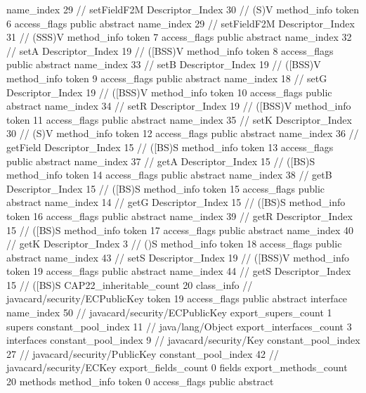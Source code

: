 {{{{{					name_index	29		// setFieldF2M
					Descriptor_Index	30		// (S)V
				}
				method_info {
					token	6
					access_flags	public abstract
					name_index	29		// setFieldF2M
					Descriptor_Index	31		// (SSS)V
				}
				method_info {
					token	7
					access_flags	public abstract
					name_index	32		// setA
					Descriptor_Index	19		// ([BSS)V
				}
				method_info {
					token	8
					access_flags	public abstract
					name_index	33		// setB
					Descriptor_Index	19		// ([BSS)V
				}
				method_info {
					token	9
					access_flags	public abstract
					name_index	18		// setG
					Descriptor_Index	19		// ([BSS)V
				}
				method_info {
					token	10
					access_flags	public abstract
					name_index	34		// setR
					Descriptor_Index	19		// ([BSS)V
				}
				method_info {
					token	11
					access_flags	public abstract
					name_index	35		// setK
					Descriptor_Index	30		// (S)V
				}
				method_info {
					token	12
					access_flags	public abstract
					name_index	36		// getField
					Descriptor_Index	15		// ([BS)S
				}
				method_info {
					token	13
					access_flags	public abstract
					name_index	37		// getA
					Descriptor_Index	15		// ([BS)S
				}
				method_info {
					token	14
					access_flags	public abstract
					name_index	38		// getB
					Descriptor_Index	15		// ([BS)S
				}
				method_info {
					token	15
					access_flags	public abstract
					name_index	14		// getG
					Descriptor_Index	15		// ([BS)S
				}
				method_info {
					token	16
					access_flags	public abstract
					name_index	39		// getR
					Descriptor_Index	15		// ([BS)S
				}
				method_info {
					token	17
					access_flags	public abstract
					name_index	40		// getK
					Descriptor_Index	3		// ()S
				}
				method_info {
					token	18
					access_flags	public abstract
					name_index	43		// setS
					Descriptor_Index	19		// ([BSS)V
				}
				method_info {
					token	19
					access_flags	public abstract
					name_index	44		// getS
					Descriptor_Index	15		// ([BS)S
				}
			}
			CAP22_inheritable_count	20
		}
		class_info {		// javacard/security/ECPublicKey
			token	19
			access_flags	public abstract interface
			name_index	50		// javacard/security/ECPublicKey
			export_supers_count	1
			supers {
				constant_pool_index	11		// java/lang/Object
			}
			export_interfaces_count	3
			interfaces {
				constant_pool_index	9		// javacard/security/Key
				constant_pool_index	27		// javacard/security/PublicKey
				constant_pool_index	42		// javacard/security/ECKey
			}
			export_fields_count	0
			fields {
			}
			export_methods_count	20
			methods {
				method_info {
					token	0
					access_flags	public abstract
}}}}}
